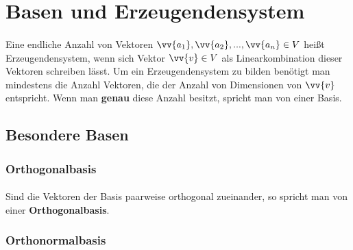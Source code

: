 \section{Basen und Erzeugendensystem}

    \paragraph{} Eine endliche Anzahl von Vektoren $\vv{a_1},\vv{a_2},...,\vv{a_n}\in V$ heißt Erzeugendensystem, wenn sich  Vektor $\vv{v}\in V$
     als Linearkombination dieser Vektoren schreiben lässt. Um ein Erzeugendensystem zu bilden benötigt man mindestens die Anzahl Vektoren, die der Anzahl
      von Dimensionen von $\vv{v}$ entspricht. Wenn man \textbf{genau} diese Anzahl besitzt, spricht man von einer Basis.


    \subsection{Besondere Basen}


        \subsubsection{Orthogonalbasis}

            \paragraph{} Sind die Vektoren der Basis paarweise orthogonal zueinander, so spricht man von einer \textbf{Orthogonalbasis}.


        \subsubsection{Orthonormalbasis}

